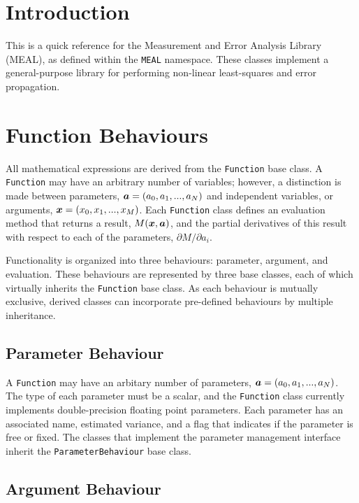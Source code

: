 \documentclass[12pt]{article}
\newcommand{\mbf}[1]{\mbox{\boldmath $#1$}}
\begin{document}
\section{Introduction}

This is a quick reference for the Measurement and Error Analysis
Library (MEAL), as defined within the {\tt MEAL} namespace.  These
classes implement a general-purpose library for performing non-linear
least-squares and error propagation.

\section{Function Behaviours}

All mathematical expressions are derived from the {\tt Function} base
class.  A {\tt Function} may have an arbitrary number of variables;
however, a distinction is made between parameters, ${\mbf a}=(a_0,
a_1, ... , a_N)$ and independent variables, or arguments, ${\mbf
x}=(x_0, x_1, ... , x_M)$.  Each {\tt Function} class defines an
evaluation method that returns a result, $M({\mbf x},{\mbf a})$, and
the partial derivatives of this result with respect to each of the
parameters, $\partial M/\partial a_i$.

Functionality is organized into three behaviours: parameter, argument,
and evaluation.  These behaviours are represented by three base
classes, each of which virtually inherits the {\tt Function} base
class.  As each behaviour is mutually exclusive, derived classes can
incorporate pre-defined behaviours by multiple inheritance.

\subsection{Parameter Behaviour}

A {\tt Function} may have an arbitary number of parameters,
$\mbf{a}=(a_0, a_1, ... , a_N)$.  The type of each parameter must be a
scalar, and the {\tt Function} class currently implements
double-precision floating point parameters.  Each parameter has an
associated name, estimated variance, and a flag that indicates if the
parameter is free or fixed.  The classes that implement the parameter
management interface inherit the {\tt ParameterBehaviour} base class.

\subsection{Argument Behaviour}
\end{document}
